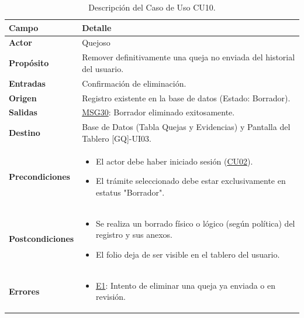 \begin{appendices}
\begin{table}[htbp]
\centering
\small
\begin{tabular}{|p{3.5cm}|p{10.5cm}|}
\hline
\rowcolor[HTML]{EFEFEF} 
\textbf{Campo} & \textbf{Detalle} \\ \hline
\textbf{Actor} & Quejoso \\ \hline
\textbf{Propósito} & Remover definitivamente una queja no enviada del historial del usuario. \\ \hline
\textbf{Entradas} & Confirmación de eliminación. \\ \hline
\textbf{Origen} & Registro existente en la base de datos (Estado: Borrador). \\ \hline
\textbf{Salidas} & \hyperlink{msg:MSG30}{MSG30}: Borrador eliminado exitosamente. \\ \hline
\textbf{Destino} & Base de Datos (Tabla Quejas y Evidencias) y Pantalla del Tablero [GQ]-UI03. \\ \hline
\textbf{Precondiciones} & 
\begin{itemize}[nosep, leftmargin=*]
    \item El actor debe haber iniciado sesión (\hyperlink{anexo:casos_uso}{CU02}).
    \item El trámite seleccionado debe estar exclusivamente en estatus "Borrador".
\end{itemize} \\ \hline
\textbf{Postcondiciones} & 
\begin{itemize}[nosep, leftmargin=*]
    \item Se realiza un borrado físico o lógico (según política) del registro y sus anexos.
    \item El folio deja de ser visible en el tablero del usuario.
\end{itemize} \\ \hline
\textbf{Errores} & 
\begin{itemize}[nosep, leftmargin=*]
    \item \hyperlink{err:E15}{E1}: Intento de eliminar una queja ya enviada o en revisión.
\end{itemize} \\ \hline
\end{tabular}
\caption{Descripción del Caso de Uso CU10.}
\label{tab:cu10_especificacion}
\end{table}


\end{appendices}

